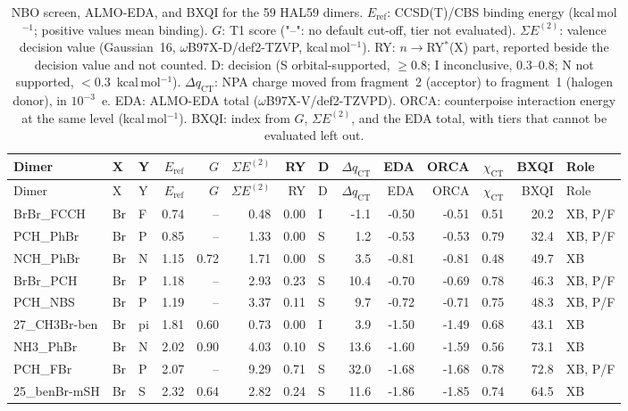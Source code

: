 {\scriptsize
\setlength{\tabcolsep}{3pt}
\begin{longtable}{lllrrrrlrrrrrl}
\caption{NBO screen, ALMO-EDA, and BXQI for the 59 HAL59 dimers. $E_\mathrm{ref}$: CCSD(T)/CBS binding energy (kcal\,mol$^{-1}$; positive values mean binding). $G$: T1 score ("--": no default cut-off, tier not evaluated). $\Sigma E^{(2)}$: valence decision value (Gaussian~16, $\omega$B97X-D/def2-TZVP, kcal\,mol$^{-1}$). RY: $n\to$RY$^*$(X) part, reported beside the decision value and not counted. D: decision (S orbital-supported, $\ge 0.8$; I inconclusive, 0.3--0.8; N not supported, $<0.3$~kcal\,mol$^{-1}$). $\Delta q_\mathrm{CT}$: NPA charge moved from fragment~2 (acceptor) to fragment~1 (halogen donor), in $10^{-3}$~e. EDA: ALMO-EDA total ($\omega$B97X-V/def2-TZVPD). ORCA: counterpoise interaction energy at the same level (kcal\,mol$^{-1}$). BXQI: index from $G$, $\Sigma E^{(2)}$, and the EDA total, with tiers that cannot be evaluated left out.}\label{tab:qmhal}\\
\toprule
Dimer & X & Y & $E_\mathrm{ref}$ & $G$ & $\Sigma E^{(2)}$ & RY & D & $\Delta q_\mathrm{CT}$ & EDA & ORCA & $\chi_\mathrm{CT}$ & BXQI & Role\\
\midrule
\endfirsthead
\toprule
Dimer & X & Y & $E_\mathrm{ref}$ & $G$ & $\Sigma E^{(2)}$ & RY & D & $\Delta q_\mathrm{CT}$ & EDA & ORCA & $\chi_\mathrm{CT}$ & BXQI & Role\\
\midrule
\endhead
\bottomrule
\endlastfoot
BrBr\_FCCH & Br & F & 0.74 & -- & 0.48 & 0.00 & I & -1.1 & -0.50 & -0.51 & 0.51 & 20.2 & XB, P/F\\
PCH\_PhBr & Br & P & 0.85 & -- & 1.33 & 0.00 & S & 1.2 & -0.53 & -0.53 & 0.79 & 32.4 & XB, P/F\\
NCH\_PhBr & Br & N & 1.15 & 0.72 & 1.71 & 0.00 & S & 3.5 & -0.81 & -0.81 & 0.48 & 49.7 & XB\\
BrBr\_PCH & Br & P & 1.18 & -- & 2.93 & 0.23 & S & 10.4 & -0.70 & -0.69 & 0.78 & 46.3 & XB, P/F\\
PCH\_NBS & Br & P & 1.19 & -- & 3.37 & 0.11 & S & 9.7 & -0.72 & -0.71 & 0.75 & 48.3 & XB, P/F\\
27\_CH3Br-ben & Br & pi & 1.81 & 0.60 & 0.73 & 0.00 & I & 3.9 & -1.50 & -1.49 & 0.68 & 43.1 & XB\\
NH3\_PhBr & Br & N & 2.02 & 0.90 & 4.03 & 0.10 & S & 13.6 & -1.60 & -1.59 & 0.56 & 73.1 & XB\\
PCH\_FBr & Br & P & 2.07 & -- & 9.29 & 0.71 & S & 32.0 & -1.68 & -1.68 & 0.78 & 72.8 & XB, P/F\\
25\_benBr-mSH & Br & S & 2.32 & 0.64 & 2.82 & 0.24 & S & 11.6 & -1.86 & -1.85 & 0.74 & 64.5 & XB\\

\end{longtable}}
